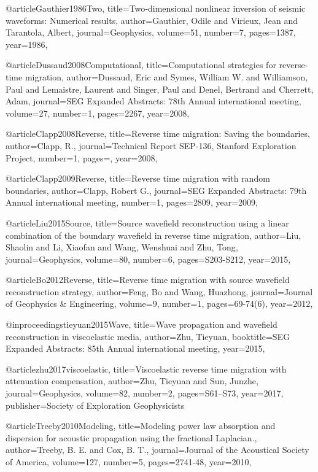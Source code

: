 {@article{Gauthier1986Two,
  title={Two‐dimensional nonlinear inversion of seismic waveforms: Numerical results},
  author={Gauthier, Odile and Virieux, Jean and Tarantola, Albert},
  journal={Geophysics},
  volume={51},
  number={7},
  pages={1387},
  year={1986},
}

@article{Dussaud2008Computational,
  title={Computational strategies for reverse-time migration},
  author={Dussaud, Eric and Symes, William W. and Williamson, Paul and Lemaistre, Laurent and Singer, Paul and Denel, Bertrand and Cherrett, Adam},
  journal={SEG Expanded Abstracts: 78th Annual international meeting},
  volume={27},
  number={1},
  pages={2267},
  year={2008},
}

@article{Clapp2008Reverse,
  title={Reverse time migration: Saving the boundaries},
  author={Clapp, R.},
  journal={Technical Report SEP-136, Stanford Exploration Project},
  number={1},
  pages={},
  year={2008},
}

@article{Clapp2009Reverse,
  title={Reverse time migration with random boundaries},
  author={Clapp, Robert G.},
  journal={SEG Expanded Abstracts: 79th Annual international meeting},
  number={1},
  pages={2809},
  year={2009},
}

@article{Liu2015Source,
  title={Source wavefield reconstruction using a linear combination of the boundary wavefield in reverse time migration},
  author={Liu, Shaolin and Li, Xiaofan and Wang, Wenshuai and Zhu, Tong},
  journal={Geophysics},
  volume={80},
  number={6},
  pages={S203-S212},
  year={2015},
}

@article{Bo2012Reverse,
  title={Reverse time migration with source wavefield reconstruction strategy},
  author={Feng, Bo and Wang, Huazhong},
  journal={Journal of Geophysics \& Engineering},
  volume={9},
  number={1},
  pages={69-74(6)},
  year={2012},
}

@inproceedings{tieyuan2015Wave,
  title={Wave propagation and wavefield reconstruction in viscoelastic media},
  author={Zhu, Tieyuan},
  booktitle={SEG Expanded Abstracts: 85th Annual international meeting},
  year={2015},
}

@article{zhu2017viscoelastic,
  title={Viscoelastic reverse time migration with attenuation compensation},
  author={Zhu, Tieyuan and Sun, Junzhe},
  journal={Geophysics},
  volume={82},
  number={2},
  pages={S61--S73},
  year={2017},
  publisher={Society of Exploration Geophysicists}
}


@article{Treeby2010Modeling,
  title={Modeling power law absorption and dispersion for acoustic propagation using the fractional Laplacian.},
  author={Treeby, B. E. and Cox, B. T.},
  journal={Journal of the Acoustical Society of America},
  volume={127},
  number={5},
  pages={2741-48},
  year={2010},
}

}
